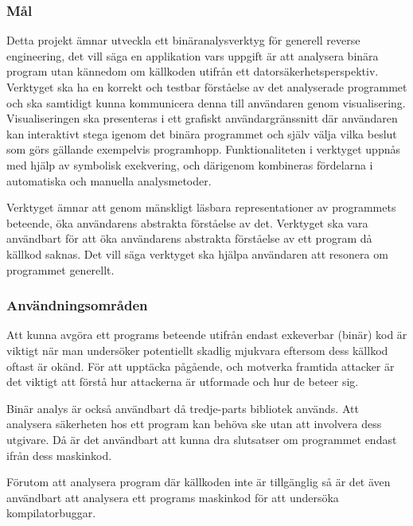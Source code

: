 \subsubsection{Mål}
Detta projekt ämnar utveckla ett binäranalysverktyg för generell reverse
engineering, det vill säga en applikation vars uppgift är att analysera binära
program utan kännedom om källkoden utifrån ett datorsäkerhetsperspektiv.
Verktyget ska ha en korrekt och testbar förståelse av det analyserade programmet
och ska samtidigt kunna kommunicera denna till användaren genom visualisering.
Visualiseringen ska presenteras i ett grafiskt användargränssnitt där användaren
kan interaktivt stega igenom det binära programmet och själv välja vilka beslut
som görs gällande exempelvis programhopp. Funktionaliteten i verktyget uppnås
med hjälp av symbolisk exekvering, och därigenom kombineras fördelarna i
automatiska och manuella analysmetoder.

Verktyget ämnar att genom mänskligt läsbara representationer av programmets 
beteende, öka användarens abstrakta förståelse av det. Verktyget ska vara 
användbart för att öka användarens abstrakta förståelse av ett program då källkod 
saknas. Det vill säga verktyget ska hjälpa användaren att resonera om programmet 
generellt. 

\subsubsection{Användningsområden}
Att kunna avgöra ett programs beteende utifrån endast exkeverbar (binär) 
kod är viktigt när man undersöker potentiellt skadlig mjukvara eftersom
dess källkod oftast är okänd. För att upptäcka pågående, och motverka 
framtida attacker är det viktigt att förstå hur attackerna är utformade och
hur de beteer sig. 

Binär analys är också användbart då tredje-parts bibliotek används.
Att analysera säkerheten hos ett program kan behöva ske utan att involvera 
dess utgivare. Då är det användbart att kunna dra slutsatser om programmet 
endast ifrån dess maskinkod. 

Förutom att analysera program där källkoden inte är tillgänglig så är det även 
användbart att analysera ett programs maskinkod för att undersöka kompilatorbuggar.


